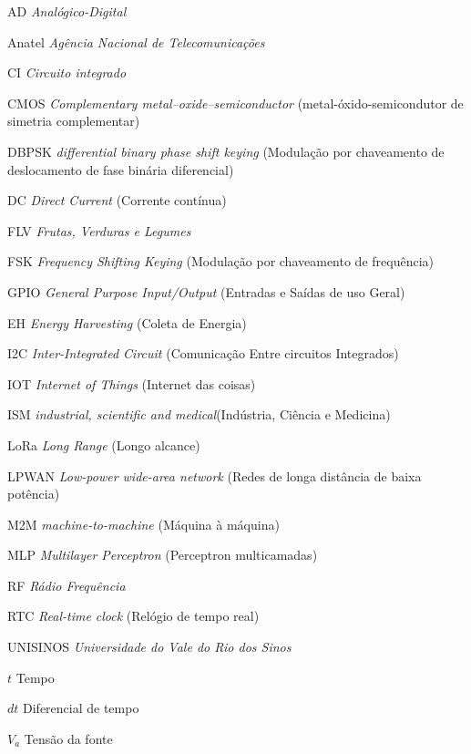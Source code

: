 \listoffigures*
\cleardoublepage

\listofquadros*
\cleardoublepage

\listoftables*
\cleardoublepage

\begin{siglas}
    \item[AD] \textit{Analógico-Digital}
    \item[Anatel]   \textit{Agência Nacional de Telecomunicações}
    \item[CI]   \textit{Circuito integrado}
    \item[CMOS] \textit{Complementary metal–oxide–semiconductor} (metal-óxido-semicondutor de simetria complementar)
    \item[DBPSK]    \textit{differential binary phase shift keying} (Modulação por chaveamento de deslocamento de fase binária diferencial)
    \item[DC]  \textit{Direct Current} (Corrente contínua)
    \item[FLV] \textit{Frutas, Verduras e Legumes}
    \item[FSK] \textit{Frequency Shifting Keying} (Modulação por chaveamento de frequência)
    \item[GPIO]     \textit{General Purpose Input/Output} (Entradas e Saídas de uso Geral)
    \item[EH]   \textit{Energy Harvesting} (Coleta de Energia) 
    \item[I2C]  \textit{Inter-Integrated Circuit} (Comunicação Entre circuitos Integrados)
    \item[IOT]  \textit{Internet of Things} (Internet das coisas)
    \item[ISM]  \textit{industrial, scientific and medical}(Indústria, Ciência e Medicina)
    \item[LoRa] \textit{Long Range} (Longo alcance)
    \item[LPWAN] \textit{Low-power wide-area network} (Redes de longa distância de baixa potência)
    \item[M2M] \textit{machine-to-machine} (Máquina à máquina) 
    \item [MLP] \textit{Multilayer Perceptron} (Perceptron multicamadas)
    \item[RF]  \textit{Rádio Frequência}
    \item[RTC]  \textit{Real-time clock} (Relógio de tempo real)
    \item[UNISINOS]  \textit{Universidade do Vale do Rio dos Sinos}

\end{siglas}

\begin{simbolos}
  \item[$t$] Tempo
  \item[$dt$] Diferencial de tempo
  \item[$V_a$] Tensão da fonte
\end{simbolos}

\tableofcontents*
\cleardoublepage
